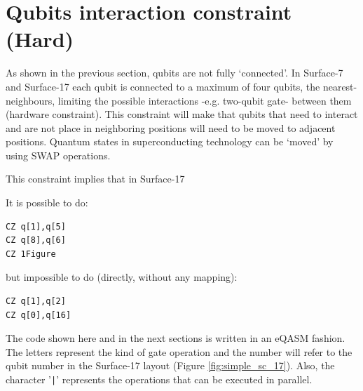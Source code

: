 \documentclass[11pt]{article}
\begin{document}
\section{Qubits interaction constraint (Hard)}
\label{sec:org77a3a48}

As shown in the previous section, qubits are not fully `connected'.
In Surface-7 and Surface-17 each qubit is connected to a maximum of four qubits, the nearest-neighbours, limiting the possible interactions -e.g. two-qubit gate- between them (hardware constraint). This constraint will make that qubits that need to interact and are not place in neighboring positions will need to be moved to adjacent positions. Quantum states in superconducting technology can be `moved' by using SWAP operations.






This constraint implies that in Surface-17





\begin{minipage}[t]{.45\textwidth}

It is possible to do:

\begin{verbatim}
CZ q[1],q[5]
CZ q[8],q[6]
CZ 1Figure\end{verbatim}

\end{minipage}
\hfill %
\begin{minipage}[t]{.45\textwidth}

but impossible to do (directly, without any mapping):

\begin{verbatim}
CZ q[1],q[2]
CZ q[0],q[16]
\end{verbatim}

\end{minipage}

The code shown here and in the next sections is written in an eQASM fashion.
The letters represent the kind of gate operation and the number will refer to the qubit number in the Surface-17 layout (Figure \ref{fig:simple_sc_17}).
Also, the character '\texttt{|}' represents the operations that can be executed in parallel. 
\end{document}
